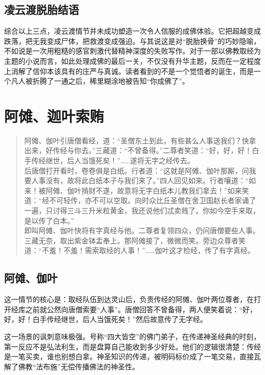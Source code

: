 \documentclass{ctexart}
\begin{document}
\subsection{凌云渡脱胎结语}

综合以上三点，凌云渡情节并未成功塑造一次令人信服的成佛体验。它把超越变成跌落，把无我变成尸体，把救渡变成强迫。与其说这是对“脱胎换骨”的巧妙隐喻，不如说是一次用粗糙的感官刺激代替精神深度的失败写作。对于一部以佛教取经为主题的小说而言，如此处理成佛的最后一关，不仅没有升华主题，反而在一定程度上消解了信仰本该具有的庄严与真诚。读者看到的不是一个觉悟者的诞生，而是一个凡人被折腾了一通之后，稀里糊涂地被告知“你成佛了”。

\section{阿傩、迦叶索贿}

\begin{quotation}
阿傩、伽叶引唐僧看经，道：“圣僧东土到此，有些甚么人事送我们？快拿出来，好传经与你去。”三藏道：“不曾备得。”二尊者笑道：“好，好，好！白手传经继世，后人当饿死矣！”……遂将无字之经传去。 \\

后唐僧打开看时，卷卷俱是白纸。行者道：“这就是阿傩、伽叶那厮，问我要人事没有，故将此白纸本子与我们来了。”四人回见如来。行者嚷道：“如来！被阿傩、伽叶掯财不遂，故意将无字白纸本儿教我们拿去！”如来笑道：“经不可轻传，亦不可以空取。向时众比丘圣僧在舍卫国赵长者家诵了一遍，只讨得三斗三升米粒黄金，我还说他们忒卖贱了。你如今空手来取，是以传了白本。” \\

即叫阿傩、伽叶快将有字真经与他。二尊者复领四众，仍问唐僧要些人事。三藏无奈，取出紫金钵盂奉上。那阿傩接了，微微而笑。旁边众尊者笑道：“不羞！不羞！需索取经的人事！”……伽叶这才检经，传了有字真经。

\end{quotation}
\subsection{阿傩、伽叶}

这一情节的核心是：取经队伍到达灵山后，负责传经的阿傩、伽叶两位尊者，在打开经库之前就公然向唐僧索要“人事”。唐僧回答不曾备得，两人便笑着说：“好，好，好！白手传经继世，后人当饿死矣！”然后故意传了无字经。

这一场景的讽刺意味极强。号称“四大皆空”的佛门弟子，在传递神圣经典的时刻，第一反应不是弘法利生，而是盘算自己能收到多少好处。他们的逻辑很清楚：传经是一笔买卖，谁也别想白拿。神圣知识的传递，被明码标价成了一笔交易，直接瓦解了佛教“法布施”无偿传播佛法的神圣性。
\end{document}
